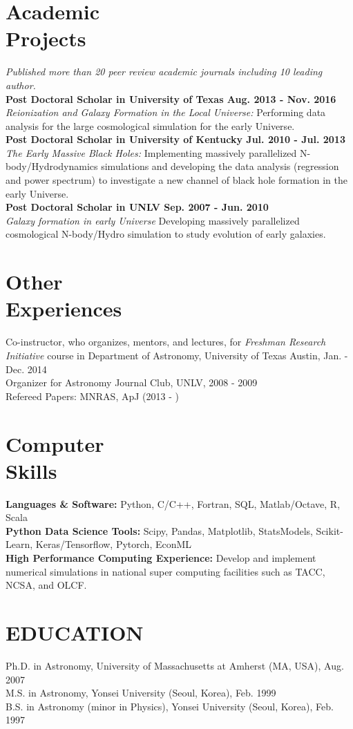 \documentclass[margin,centered]{res}
\begin{document}
\begin{resume}
\section{Academic \\ Projects} {\it Published more than 20 peer review academic journals including 10 leading author.}\\
{\bf Post Doctoral Scholar in University of Texas Aug. 2013 - Nov. 2016} \\ 
{\it Reionization and Galaxy Formation in the Local Universe:} Performing data analysis for the large cosmological simulation for the early Universe.\\
{\bf Post Doctoral Scholar in University of Kentucky Jul. 2010 - Jul. 2013 } \\
{\it The Early Massive Black Holes:} Implementing massively parallelized N-body/Hydrodynamics simulations and developing the data analysis (regression and power spectrum) to investigate a new channel of black hole formation in the early Universe.\\
{\bf Post Doctoral Scholar in UNLV Sep. 2007 - Jun. 2010} \\
{\it Galaxy formation in early Universe}  Developing massively parallelized cosmological N-body/Hydro simulation to study evolution of early galaxies.

\section{Other \\ Experiences} 
Co-instructor, who organizes, mentors, and lectures,  for {\it Freshman Research Initiative} course in Department of Astronomy, University of Texas Austin, Jan. - Dec. 2014  \\
Organizer for Astronomy Journal Club, UNLV, 2008 - 2009 \\
Refereed Papers: MNRAS, ApJ (2013 - )

\section{Computer \\ Skills} 
{\bf Languages \& Software:} Python, C/C++, Fortran, SQL, Matlab/Octave, R, Scala\\
{\bf Python Data Science Tools:} Scipy, Pandas, Matplotlib, StatsModels, Scikit-Learn, Keras/Tensorflow, Pytorch, EconML \\
{\bf High Performance Computing Experience:} Develop and implement numerical simulations in national super computing facilities such as TACC, NCSA, and OLCF.

\section{EDUCATION} 
Ph.D. in Astronomy, University of Massachusetts at Amherst (MA, USA), Aug. 2007 \\
M.S. in Astronomy, Yonsei University (Seoul, Korea), Feb. 1999 \\
B.S. in Astronomy (minor in Physics), Yonsei University (Seoul, Korea), Feb. 1997 \\



\end{resume}
\end{document}
